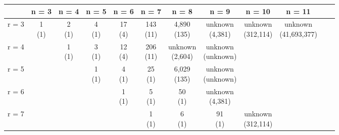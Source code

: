 \documentclass{article}
\begin{document}
\begin{table}[h]
\begin{center}
\scalebox{0.8}
{
\begin{tabular}{c | c | c | c | c | c | c | c | c | c | c | c |}
        & n = 3 & n = 4 & n = 5 & n = 6 & n = 7 & n = 8 & n = 9 & n = 10 & n = 11\\
 \hline
 r = 3  & \shortstack{1 \\ (1)}     &  \shortstack{2 \\ (1)}    &  \shortstack{4 \\ (1)}    &  \shortstack{17 \\ (4)}    &   \shortstack{143 \\ (11)}   &  \shortstack{4,890 \\ (135)}    &   \shortstack{unknown \\ (4,381)}   & \shortstack{unknown \\ (312,114)} & \shortstack{unknown \\ (41,693,377)} \\
 \hline 
 r = 4  &       &  \shortstack{1 \\ (1)}    &  \shortstack{3 \\ (1)}    &   \shortstack{12 \\ (4)}   &   \shortstack{206 \\ (11)}  & \shortstack{unknown \\ (2,604)}   & \shortstack{unknown \\ (unknown)} & & \\
 \hline
 r = 5  &       &       &  \shortstack{1 \\ (1)}    &   \shortstack{4 \\ (1)}   &  \shortstack{25 \\ (1)}   & \shortstack{6,029 \\ (135)} & \shortstack{unknown \\ (unknown)} & & \\
 \hline
 r = 6  &       &       &        &  \shortstack{1 \\ (1)}   &  \shortstack{5 \\ (1)}    & \shortstack{50 \\ (1)}   & \shortstack{unknown \\ (4,381)} & & \\
 \hline
 r = 7  &       &       &        &     &  \shortstack{1 \\ (1)}    & \shortstack{6 \\ (1)}   & \shortstack{91 \\ (1)} & \shortstack{unknown \\ (312,114)} & \\

\end{tabular}}
\end{center}
\end{table}
\end{document}
